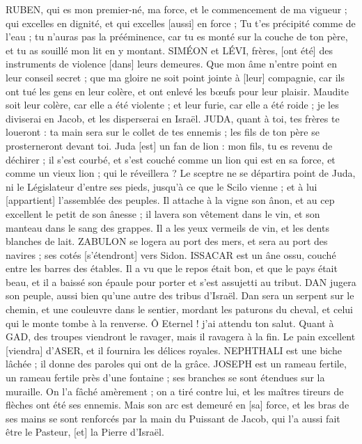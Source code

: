 \begin{multicols}{2}
RUBEN, qui es mon premier-né, ma force, et le commencement de ma vigueur ; qui excelles en dignité, et qui excelles [aussi] en force ;
Tu t'es précipité comme de l'eau ; tu n'auras pas la prééminence, car tu es monté sur la couche de ton père, et tu as souillé mon lit en y montant.
SIMÉON et LÉVI, frères, [ont été] des instruments de violence [dans] leurs demeures.
Que mon âme n'entre point en leur conseil secret ; que ma gloire ne soit point jointe à [leur] compagnie, car ils ont tué les gens en leur colère, et ont enlevé les bœufs pour leur plaisir.
Maudite soit leur colère, car elle a été violente ; et leur furie, car elle a été roide ; je les diviserai en Jacob, et les disperserai en Israël.
JUDA, quant à toi, tes frères te loueront : ta main sera sur le collet de tes ennemis ; les fils de ton père se prosterneront devant toi.
Juda [est] un fan de lion : mon fils, tu es revenu de déchirer ; il s'est courbé, et s'est couché comme un lion qui est en sa force, et comme un vieux lion ; qui le réveillera ?
Le sceptre ne se départira point de Juda, ni le Législateur d'entre ses pieds, jusqu'à ce que le Scilo vienne ; et à lui [appartient] l'assemblée des peuples.
Il attache à la vigne son ânon, et au cep excellent le petit de son ânesse ; il lavera son vêtement dans le vin, et son manteau dans le sang des grappes.
Il a les yeux vermeils de vin, et les dents blanches de lait.
ZABULON se logera au port des mers, et sera au port des navires ; ses cotés [s'étendront] vers Sidon.
ISSACAR est un âne ossu, couché entre les barres des étables.
Il a vu que le repos était bon, et que le pays était beau, et il a baissé son épaule pour porter et s'est assujetti au tribut.
DAN jugera son peuple, aussi bien qu'une autre des tribus d'Israël.
Dan sera un serpent sur le chemin, et une couleuvre dans le sentier, mordant les paturons du cheval, et celui qui le monte tombe à la renverse.
Ô Eternel ! j'ai attendu ton salut.
Quant à GAD, des troupes viendront le ravager, mais il ravagera à la fin.
Le pain excellent [viendra] d'ASER, et il fournira les délices royales.
NEPHTHALI est une biche lâchée ; il donne des paroles qui ont de la grâce.
JOSEPH est un rameau fertile, un rameau fertile près d'une fontaine ; ses branches se sont étendues sur la muraille.
On l'a fâché amèrement ; on a tiré contre lui, et les maîtres tireurs de flèches ont été ses ennemis.
Mais son arc est demeuré en [sa] force, et les bras de ses mains se sont renforcés par la main du Puissant de Jacob, qui l'a aussi fait être le Pasteur, [et] la Pierre d'Israël.

\end{multicols}
